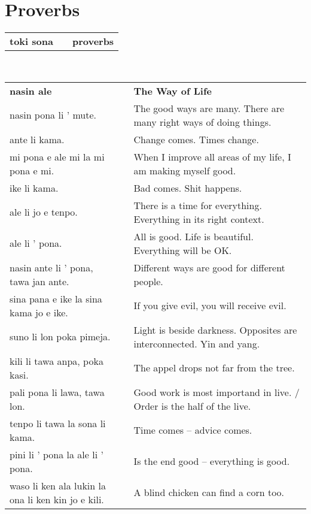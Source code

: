 %
\section{Proverbs}
%
\begin{supertabular}{p{6cm}|ll}
\textbf{toki sona} && \textbf{proverbs} \\
\end{supertabular} \\
%
\begin{supertabular}{p{6cm}|ll}
\textbf{nasin ale} && \textbf{The Way of Life} \\
nasin pona li ' mute. && The good ways are many. There are many right ways of doing things. \\
ante li kama.  && Change comes. Times change.  \\
mi pona e ale mi la mi pona e mi.  && When I improve all areas of my life, I am making myself good.  \\
ike li kama. && Bad comes. Shit happens.  \\ 
ale li jo e tenpo.  && There is a time for everything. Everything in its right context. \\
ale li ' pona.  && All is good. Life is beautiful. Everything will be OK.  \\
nasin ante li ' pona, tawa jan ante. && Different ways are good for different people. \\ 
sina pana e ike la sina kama jo e ike. && If you give evil, you will receive evil. \\
suno li lon poka pimeja.  && Light is beside darkness. Opposites are interconnected. Yin and yang. \\
kili li tawa anpa, poka kasi. && The appel drops not far from the tree. \\
pali pona li lawa, tawa lon. && Good work is most importand in live. / Order is the half of the live. \\
tenpo li tawa la sona li kama. && Time comes -- advice comes. \\
pini li ' pona la ale li ' pona. && Is the end good -- everything is good. \\
waso li ken ala lukin la ona li ken kin jo e kili. && A blind chicken can find a corn too. \\
\end{supertabular} \\
